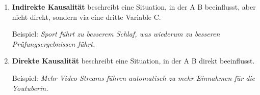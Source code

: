 \begin{mydefinition}[Kausalität]
\begin{enumerate}
    \item \textbf{Indirekte Kausalität} beschreibt eine Situation, in der A B beeinflusst, aber nicht direkt, sondern via eine dritte Variable C.
          \begin{center}
          \end{center}
          Beispiel: \textit{Sport führt zu besserem Schlaf, was wiederum zu besseren Prüfungsergebnissen führt.}
    \item \textbf{Direkte Kausalität} beschreibt eine Situation, in der A B direkt beeinflusst.
          \begin{center}
          \end{center}
          Beispiel: \textit{Mehr Video-Streams führen automatisch zu mehr Einnahmen für die Youtuberin.}
\end{enumerate}
\end{mydefinition}

